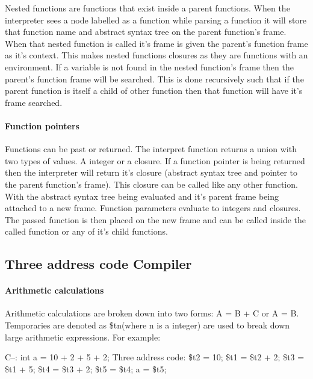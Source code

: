 \documentclass{article}
\begin{document}
	Nested functions are functions that exist inside a parent functions. When the interpreter sees a node labelled as a function while parsing a function it will store that function name and abstract syntax tree on the parent function's frame. When that nested function is called it's frame is given the parent's function frame as it's context. This makes nested functions closures as they are functions with an environment. If a variable is not found in the nested function's frame then the parent's function frame will be searched. This is done recursively such that if the parent function is itself a child of other function then that function will have it's frame searched.
	
	\paragraph{Function pointers}
	
	Functions can be past or returned. The interpret function returns a union with two types of values. A integer or a closure. If a function pointer is being returned then the interpreter will return it's closure (abstract syntax tree and pointer to the parent function's frame). This closure can be called like any other function. With the abstract syntax tree being evaluated and it's parent frame being attached to a new frame.  Function parameters evaluate to integers and closures. The passed function is then placed on the new frame and can be called inside the called function or any of it's child functions.
	
	\subsection{Three address code Compiler}
	
	\paragraph{Arithmetic calculations}
	
	Arithmetic calculations are broken down into two forms:  A = B + C or A = B. Temporaries are denoted as \$tn(where n is a integer) are used to break down large arithmetic expressions. For example: \newline\newline
	
	C--:\newline
	int a = 10 + 2 + 5 + 2;\newline
	\newline
	Three address code:\newline
	\$t2 = 10; \newline
	\$t1 = \$t2 + 2;\newline
	\$t3 = \$t1 + 5;\newline
	\$t4 = \$t3 + 2;\newline
	\$t5 = \$t4;\newline
	a = \$t5;\newline
	
\end{document}
